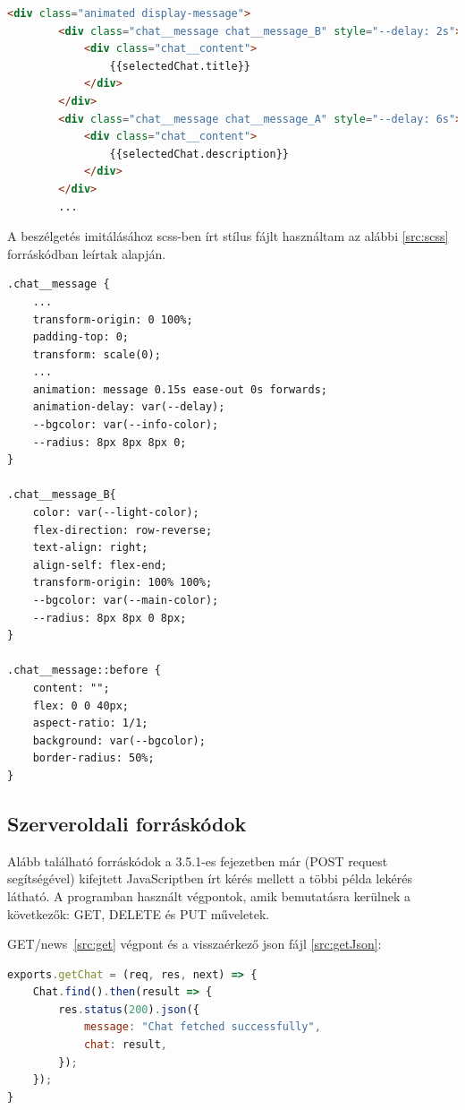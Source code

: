 \begin{lstlisting}[language=html]
	<div class="animated display-message">
		<div class="chat__message chat__message_B" style="--delay: 2s">
			<div class="chat__content">
				{{selectedChat.title}}
			</div>
		</div>
		<div class="chat__message chat__message_A" style="--delay: 6s">
			<div class="chat__content">
				{{selectedChat.description}}
			</div>
		</div>
		...
\end{lstlisting}

A beszélgetés imitálásához scss-ben írt stílus fájlt használtam az alábbi \ref{src:scss} forráskódban leírtak alapján.

\begin{lstlisting}
.chat__message {
	...
	transform-origin: 0 100%;
	padding-top: 0;
	transform: scale(0);
	...
	animation: message 0.15s ease-out 0s forwards;
	animation-delay: var(--delay);
	--bgcolor: var(--info-color);
	--radius: 8px 8px 8px 0;
}

.chat__message_B{
	color: var(--light-color);
	flex-direction: row-reverse;
	text-align: right;
	align-self: flex-end;
	transform-origin: 100% 100%;
	--bgcolor: var(--main-color);
	--radius: 8px 8px 0 8px;
}

.chat__message::before {
	content: "";
	flex: 0 0 40px;
	aspect-ratio: 1/1;
	background: var(--bgcolor);
	border-radius: 50%;
}
\end{lstlisting}

\subsection{Szerveroldali forráskódok}
Alább található forráskódok a 3.5.1-es fejezetben már (POST request segítségével) kifejtett JavaScriptben írt kérés mellett a többi példa lekérés látható. A programban használt végpontok, amik bemutatásra kerülnek a következők: GET, DELETE és PUT műveletek.

GET/news~\ref{src:get} végpont és a visszaérkező json fájl \ref{src:getJson}:

\begin{lstlisting}[language=JavaScript]
exports.getChat = (req, res, next) => {
	Chat.find().then(result => {
		res.status(200).json({
			message: "Chat fetched successfully",
			chat: result,
		});
	});
}
\end{lstlisting}


